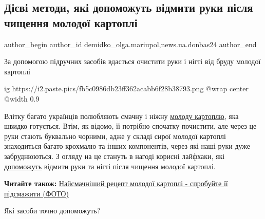  
 
 
 
 
 
\subsection{Дієві методи, які допоможуть відмити руки після чищення молодої картоплі}
\label{sec:13_06_2023.stz.news.ua.donbas24.1.kartoplja}
 
\ifcmt
 author_begin
   author_id demidko_olga.mariupol,news.ua.donbas24
 author_end
\fi

\begin{qqquote}
За допомогою підручних засобів вдасться очистити руки і нігті від бруду молодої
картоплі
\end{qqquote}

\ifcmt
  ig https://i2.paste.pics/fb5c0986db23ff362acabb6f28b38793.png
  @wrap center
  @width 0.9
\fi

Влітку багато українців полюбляють смачну і ніжну
\href{https://donbas24.news/news/dijevi-laifxaki-yaki-dopomozut-ocistiti-molodu-kartoplyu}{молоду
картоплю}, яка швидко готується. Втім, як відомо, її потрібно спочатку
почистити, але через це руки стають буквально чорними, адже у складі сирої
молодої картоплі знаходиться багато крохмалю та інших компонентів, через які
наші руки дуже забруднюються. З огляду на це стануть в нагоді корисні лайфхаки,
які \href{https://novyny.live/lajfhaki/brudni-paltsi-ta-nigti-iak-shvidko-vidmiti-ruki-pislia-chishchennia-molodoyi-kartopli-96424.html}{допоможуть} відмити руки та нігті після чищення молодої картоплі.

\textbf{Читайте також:} \href{https://donbas24.news/news/naismacnisii-recept-molodoyi-kartopli-sprobuite-yiyi-pidsmaziti-foto}{Найсмачніший рецепт молодої картоплі - спробуйте її підсмажити (ФОТО)}

Які засоби точно допоможуть?

